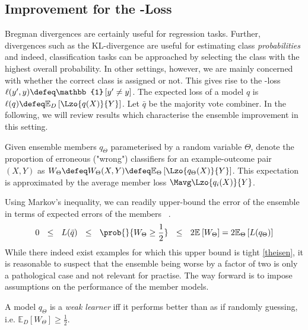 \documentclass[../main.tex]{subfiles}
\begin{document}
\subsection{Improvement for the \zeroone-Loss}

Bregman divergences are certainly useful for regression tasks. Further, divergences such as the \textsc{KL}-divergence are useful for estimating class \textit{probabilities} and indeed, classification tasks can be approached by selecting the class with the highest overall probability.
In other settings, however, we are mainly concerned with whether the correct class is assigned or not. This gives rise to the \zeroone-loss $\ell(y', y) \defeq \mathbb{1}\left[ y' \not = y \right]$. The expected loss of a model $q$ is $\ell(q_{}) \defeq \mathbb{E}_{D}\left[ \Lzo{q_{}(X)}{Y} \right]$. Let $\bar{q}$ be the majority vote combiner.
In the following, we will review results which characterise the ensemble improvement in this setting.

Given ensemble members $q_{\Theta}$ parameterised by a random variable $\Theta$, denote the proportion of erroneous ("wrong") classifiers for an example-outcome pair $(X,Y)$ as $W_{\Theta} \defeq W_{\Theta}(X,Y) \defeq \mathbb{E}_{\Theta}\left[ \Lzo{q_{\Theta}(X)}{Y} \right]$. This expectation is approximated by the average member loss $\Mavg\Lzo{q_{i}(X)}{Y}$. 

Using Markov's inequality, we can readily upper-bound the error of the ensemble in terms of expected errors of the members~\cite{theisen}
.
$$
0 
~ ~ \leq ~ ~ 
L(\bar{q}) 
~ ~ \leq ~ ~ 
\prob{}{W_{\Theta}  \geq \frac{1}{2}} 
~ ~\leq ~ ~
2 \mathbb{E}_{}\left[ W_{\Theta} \right] 
= 
2 \mathbb{E}_{\Theta}\left[ L(q_{\Theta}) \right] 
$$
While there indeed exist examples for which this upper bound is tight \ref{theisen}, it is reasonable to suspect that the ensemble being worse by a factor of two is only a pathological case and not relevant for practise.
The way forward is to impose assumptions on the performance of the member models.

\begin{definition} 
   \label{def:weak-learner} 
    A model $q_\Theta$ is a \textit{weak learner} iff it performs better than as if randomly guessing, i.e. $\mathbb{E}_{D}\left[ W_{\Theta} \right] \geq \frac{1}{2}$.
\end{definition}
\end{document}
